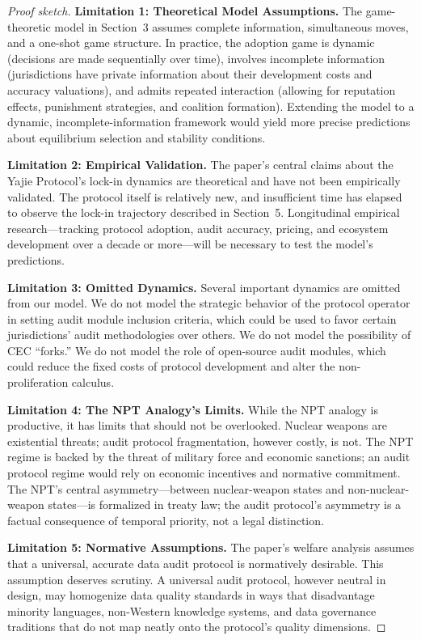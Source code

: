 \documentclass[12pt,a4paper]{ctexart}
\theoremstyle{definition}
\theoremstyle{remark}
\begin{document}
\begin{proof}[Proof sketch]
\textbf{Limitation 1: Theoretical Model Assumptions.} The game-theoretic model in Section~3 assumes complete information, simultaneous moves, and a one-shot game structure. In practice, the adoption game is dynamic (decisions are made sequentially over time), involves incomplete information (jurisdictions have private information about their development costs and accuracy valuations), and admits repeated interaction (allowing for reputation effects, punishment strategies, and coalition formation). Extending the model to a dynamic, incomplete-information framework would yield more precise predictions about equilibrium selection and stability conditions.

\textbf{Limitation 2: Empirical Validation.} The paper's central claims about the Yajie Protocol's lock-in dynamics are theoretical and have not been empirically validated. The protocol itself is relatively new, and insufficient time has elapsed to observe the lock-in trajectory described in Section~5. Longitudinal empirical research—tracking protocol adoption, audit accuracy, pricing, and ecosystem development over a decade or more—will be necessary to test the model's predictions.

\textbf{Limitation 3: Omitted Dynamics.} Several important dynamics are omitted from our model. We do not model the strategic behavior of the protocol operator in setting audit module inclusion criteria, which could be used to favor certain jurisdictions' audit methodologies over others. We do not model the possibility of CEC ``forks.'' We do not model the role of open-source audit modules, which could reduce the fixed costs of protocol development and alter the non-proliferation calculus.

\textbf{Limitation 4: The NPT Analogy's Limits.} While the NPT analogy is productive, it has limits that should not be overlooked. Nuclear weapons are existential threats; audit protocol fragmentation, however costly, is not. The NPT regime is backed by the threat of military force and economic sanctions; an audit protocol regime would rely on economic incentives and normative commitment. The NPT's central asymmetry—between nuclear-weapon states and non-nuclear-weapon states—is formalized in treaty law; the audit protocol's asymmetry is a factual consequence of temporal priority, not a legal distinction.

\textbf{Limitation 5: Normative Assumptions.} The paper's welfare analysis assumes that a universal, accurate data audit protocol is normatively desirable. This assumption deserves scrutiny. A universal audit protocol, however neutral in design, may homogenize data quality standards in ways that disadvantage minority languages, non-Western knowledge systems, and data governance traditions that do not map neatly onto the protocol's quality dimensions.


\end{proof}
\end{document}
